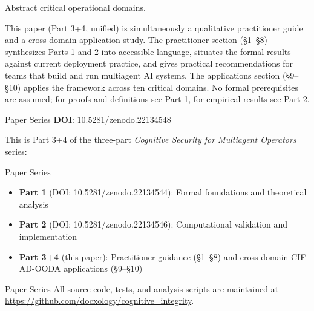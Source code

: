 \documentclass[
  ignorenonframetext,
]{beamer}
\providecommand{\tightlist}{%
  \setlength{\itemsep}{0pt}\setlength{\parskip}{0pt}}
\begin{document}
\begin{frame}[allowframebreaks]{Abstract}
critical operational domains.

This paper (Part 3+4, unified) is simultaneously a qualitative
practitioner guide and a cross-domain application study. The
practitioner section (§1--§8) synthesizes Parts 1 and 2 into accessible
language, situates the formal results against current deployment
practice, and gives practical recommendations for teams that build and
run multiagent AI systems. The applications section (§9--§10) applies
the framework across ten critical domains. No formal prerequisites are
assumed; for proofs and definitions see Part 1, for empirical results
see Part 2.
\end{frame}

\begin{frame}[allowframebreaks]{Paper Series}
\protect{}\label{paper-series}
\textbf{DOI}: 10.5281/zenodo.22134548

This is Part 3+4 of the three-part \emph{Cognitive Security for
Multiagent Operators} series:

\end{frame}

\begin{frame}[allowframebreaks]{Paper Series}
\begin{itemize}
\tightlist
\item
  \textbf{Part 1} (DOI: 10.5281/zenodo.22134544): Formal foundations and
  theoretical analysis
\item
  \textbf{Part 2} (DOI: 10.5281/zenodo.22134546): Computational
  validation and implementation
\item
  \textbf{Part 3+4} (this paper): Practitioner guidance (§1--§8) and
  cross-domain CIF-AD-OODA applications (§9--§10)
\end{itemize}

\end{frame}

\begin{frame}[allowframebreaks]{Paper Series}
All source code, tests, and analysis scripts are maintained at
\url{https://github.com/docxology/cognitive_integrity}.
\end{frame}
\end{document}
